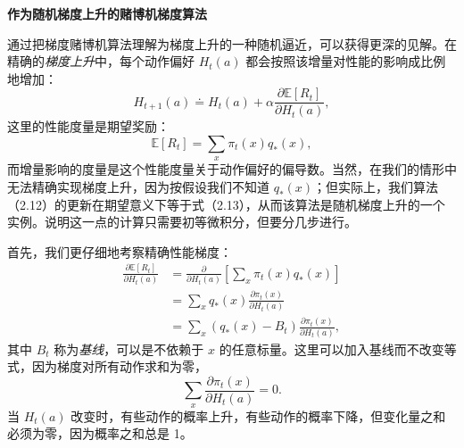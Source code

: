 \documentclass[UTF8,12pt,a4paper,fontset=fandol]{ctexart}
\begin{document}
\noindent\textbf{作为随机梯度上升的赌博机梯度算法}

\vspace{0.4em}
通过把梯度赌博机算法理解为梯度上升的一种随机逼近，可以获得更深的见解。在精确的\textit{梯度上升}中，每个动作偏好 $H_t(a)$ 都会按照该增量对性能的影响成比例地增加：
\begin{equation}
H_{t+1}(a)\doteq H_t(a)+\alpha\frac{\partial \mathbb{E}[R_t]}{\partial H_t(a)},
\tag{2.13}
\end{equation}
这里的性能度量是期望奖励：
\[
\mathbb{E}[R_t]=\sum_x\pi_t(x)q_*(x),
\]
而增量影响的度量是这个性能度量关于动作偏好的偏导数。当然，在我们的情形中无法精确实现梯度上升，因为按假设我们不知道 $q_*(x)$；但实际上，我们算法（2.12）的更新在期望意义下等于式（2.13），从而该算法是随机梯度上升的一个实例。说明这一点的计算只需要初等微积分，但要分几步进行。

首先，我们更仔细地考察精确性能梯度：
\[
\begin{aligned}
\frac{\partial \mathbb{E}[R_t]}{\partial H_t(a)}
&= \frac{\partial}{\partial H_t(a)}\left[\sum_x\pi_t(x)q_*(x)\right]\\
&= \sum_x q_*(x)\frac{\partial \pi_t(x)}{\partial H_t(a)}\\
&= \sum_x \left(q_*(x)-B_t\right)\frac{\partial \pi_t(x)}{\partial H_t(a)},
\end{aligned}
\]
其中 $B_t$ 称为\textit{基线}，可以是不依赖于 $x$ 的任意标量。这里可以加入基线而不改变等式，因为梯度对所有动作求和为零，
\[
\sum_x \frac{\partial \pi_t(x)}{\partial H_t(a)}=0.
\]
当 $H_t(a)$ 改变时，有些动作的概率上升，有些动作的概率下降，但变化量之和必须为零，因为概率之和总是 1。
\end{document}
